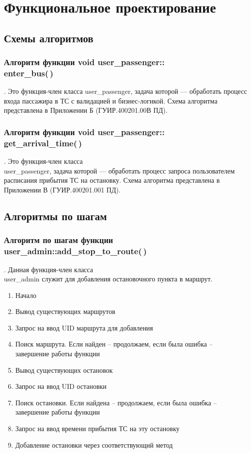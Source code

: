 \section{Функциональное проектирование}

\subsection{Схемы алгоритмов}
\subsubsection{Алгоритм функции void user\_passenger::\\enter\_bus(\,)\,}.
Это функция-член класса user\_passenger, задача которой — обработать процесс входа пассажира в ТС с валидацией и бизнес-логикой. Схема алгоритма представлена в Приложении Б (ГУИР.400201.00В ПД).
\subsubsection{Алгоритм функции void user\_passenger::\\get\_arrival\_time(\,)\,}.
Это функция-член класса \\user\_passenger, задача которой — обработать процесс запроса пользователем расписания прибытия ТС на остановку. Схема алгоритма представлена в Приложении В (ГУИР.400201.001 ПД).

\subsection{Алгоритмы по шагам}
\subsubsection{Алгоритм\cite{how_to} по шагам функции \\user\_admin::add\_stop\_to\_route(\,)\,}.
Данная функция-член класса \\user\_admin служит для добавления остановочного пункта в маршрут.
\begin{enumerate}
    \item Начало
    \item Вывод существующих маршрутов
    \item Запрос на ввод UID маршрута для добавления
    \item Поиск маршрута. Если найден -- продолжаем, если была ошибка -- завершение работы функции
    \item Вывод существующих остановок
    \item Запрос на ввод UID остановки
    \item Поиск остановки. Если найдена -- продолжаем, если была ошибка -- завершение работы функции
    \item Запрос на ввод времени прибытия ТС на эту остановку
    \item Добавление остановки через соответствующий метод
\end{enumerate}

